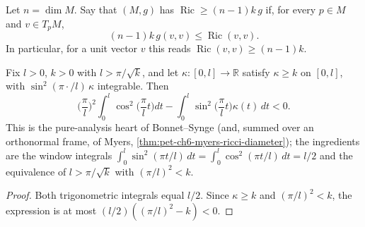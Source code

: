 \begin{definition}
  \label{def:pet-ch6-ricci-lower-bound}
  \leanok
  Let $n=\dim M$.  Say that $(M,g)$ has
  $\operatorname{Ric}\ge(n-1)k\,g$ if, for every $p\in M$ and $v\in T_pM$,
  \[
    (n-1)k\,g(v,v)\le \operatorname{Ric}(v,v).
  \]
  In particular, for a unit vector $v$ this reads
  $\operatorname{Ric}(v,v)\ge(n-1)k$.
\end{definition}

\begin{lemma}
  \label{lem:pet-ch6-bonnet-synge-index-core}
  \leanok
  Fix $l>0$, $k>0$ with $l>\pi/\sqrt k$, and let $\kappa:[0,l]\to\mathbb R$ satisfy
  $\kappa\ge k$ on $[0,l]$, with $\sin^2(\pi\cdot/l)\,\kappa$ integrable. Then
  \[
    \Big(\frac\pi l\Big)^2\int_0^l\cos^2\Big(\frac\pi lt\Big)dt
      -\int_0^l\sin^2\Big(\frac\pi lt\Big)\kappa(t)\,dt<0 .
  \]
  This is the pure-analysis heart of Bonnet--Synge (and, summed over an orthonormal frame,
  of Myers, \cref{thm:pet-ch6-myers-ricci-diameter}); the ingredients are the window
  integrals $\int_0^l\sin^2(\pi t/l)\,dt=\int_0^l\cos^2(\pi t/l)\,dt=l/2$ and the equivalence
  of $l>\pi/\sqrt k$ with $(\pi/l)^2<k$.
\end{lemma}
\begin{proof}
  \leanok
  \sketch
  Both trigonometric integrals equal \(l/2\). Since \(\kappa\ge k\) and \((\pi/l)^2<k\), the expression is at most \((l/2)((\pi/l)^2-k)<0\).
\end{proof}

